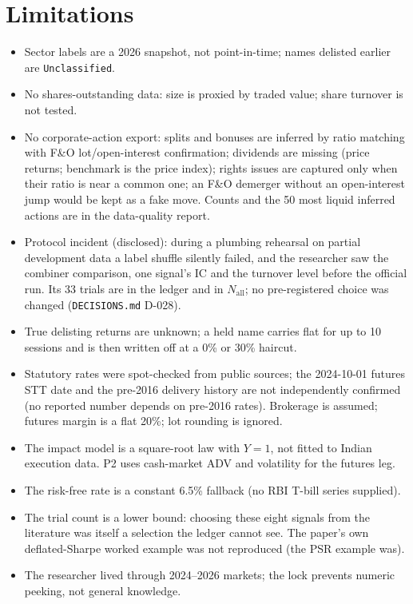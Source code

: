 \section{Limitations}\label{sec:limits}
\begin{itemize}\itemsep0pt
\item Sector labels are a 2026 snapshot, not point-in-time; names delisted earlier are \texttt{Unclassified}.
\item No shares-outstanding data: size is proxied by traded value; share turnover is not tested.
\item No corporate-action export: splits and bonuses are inferred by ratio matching with F\&O lot/open-interest confirmation; dividends are missing (price returns; benchmark is the price index); rights issues are captured only when their ratio is near a common one; an F\&O demerger without an open-interest jump would be kept as a fake move. Counts and the 50 most liquid inferred actions are in the data-quality report.
\item Protocol incident (disclosed): during a plumbing rehearsal on partial development data a label shuffle silently failed, and the researcher saw the combiner comparison, one signal's IC and the turnover level before the official run. Its 33 trials are in the ledger and in $N_{\mathrm{all}}$; no pre-registered choice was changed (\texttt{DECISIONS.md} D-028).
\item True delisting returns are unknown; a held name carries flat for up to 10 sessions and is then written off at a 0\% or 30\% haircut.
\item Statutory rates were spot-checked from public sources; the 2024-10-01 futures STT date and the pre-2016 delivery history are not independently confirmed (no reported number depends on pre-2016 rates). Brokerage is assumed; futures margin is a flat 20\%; lot rounding is ignored.
\item The impact model is a square-root law with $Y=1$, not fitted to Indian execution data. P2 uses cash-market ADV and volatility for the futures leg.
\item The risk-free rate is a constant 6.5\% fallback (no RBI T-bill series supplied).
\item The trial count is a lower bound: choosing these eight signals from the literature was itself a selection the ledger cannot see. The paper's own deflated-Sharpe worked example was not reproduced (the PSR example was).
\item The researcher lived through 2024--2026 markets; the lock prevents numeric peeking, not general knowledge.

\end{itemize}
